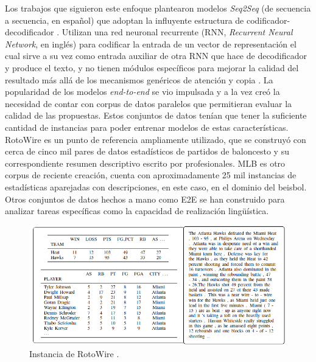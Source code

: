     Los trabajos que siguieron este enfoque  plantearon modelos \emph{Seq2Seq} (de secuencia a secuencia, en español) que adoptan la 
influyente estructura de codificador-decodificador . Utilizan una red neuronal recurrente (RNN, \emph{Recurrent Neural Network}, en inglés) 
para codificar la entrada de un vector de representación el cual sirve a su vez como entrada auxiliar de otra RNN que hace de decodificador y produce el texto, y no tienen módulos 
específicos para mejorar la calidad del resultado más allá de los mecanismos gen\'ericos de atención y copia . La popularidad de los modelos 
\emph{end-to-end} se vio impulsada y a la vez creó la necesidad de contar con corpus de datos paralelos que permitieran evaluar la calidad de las propuestas. Estos conjuntos de datos tenían que 
tener la suficiente cantidad de instancias para poder entrenar modelos de estas características. RotoWire  es un punto de referencia ampliamente utilizado, que se construyó con cerca de 
cinco mil pares de datos estadísticos de partidos de baloncesto y su correspondiente resumen descriptivo escrito por profesionales. MLB  es otro corpus de reciente creación, cuenta con aproximadamente 
25 mil instancias de estadísticas aparejadas con descripciones, en este caso, en el dominio del beisbol. Otros conjuntos de datos hechos a mano como E2E  se han construido para analizar tareas espec\'ificas 
como la capacidad de realización lingüística.

        \begin{figure}[!]
            \begin{center}
                \includegraphics[width=\textwidth]{Graphics/rotowire_instancia.png}
            \end{center}
            \caption{Instancia de RotoWire .}
            \label{fig_RotoWire}
        \end{figure}

